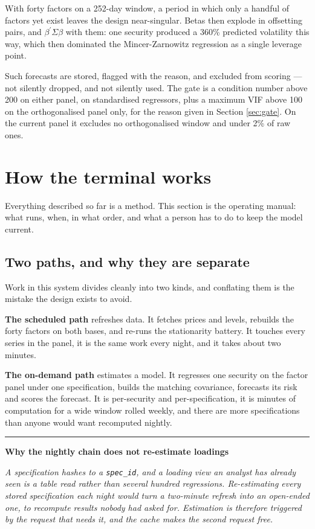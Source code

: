 \documentclass[11pt,a4paper]{article}
\newenvironment{decision}[1]
  {\par\vspace{1.7ex}%
   \begin{lrbox}{\decisionbox}\begin{minipage}{\textwidth}%
   {\color{rule}\rule{\textwidth}{0.4pt}}\par\vspace{0.7ex}
   {\small\sffamily\bfseries\color{navy}#1}\par\vspace{0.35ex}
   \small\itshape}
  {\par\vspace{0.7ex}\noindent{\color{rule}\rule{\textwidth}{0.4pt}}%
   \end{minipage}\end{lrbox}%
   \noindent\usebox{\decisionbox}\par\vspace{1.7ex}}
\newcommand{\code}[1]{\texttt{\small #1}}
\begin{document}
With forty factors on a 252-day window, a period in which only a handful of factors
yet exist leaves the design near-singular. Betas then explode in offsetting pairs, and
$\beta^{\prime}\Sigma\beta$ with them: one security produced a 360\% predicted
volatility this way, which then dominated the Mincer-Zarnowitz regression as a single
leverage point.

Such forecasts are stored, flagged with the reason, and excluded from scoring --- not
silently dropped, and not silently used. The gate is a condition number above 200 on
either panel, on standardised regressors, plus a maximum VIF above 100 on the
orthogonalised panel only, for the reason given in Section \ref{sec:gate}. On the
current panel it excludes no orthogonalised window and under 2\% of raw ones.

\section{How the terminal works}
\label{sec:workflow}

Everything described so far is a method. This section is the operating manual: what
runs, when, in what order, and what a person has to do to keep the model current.

\subsection{Two paths, and why they are separate}

Work in this system divides cleanly into two kinds, and conflating them is the
mistake the design exists to avoid.

\textbf{The scheduled path} refreshes data. It fetches prices and levels, rebuilds
the forty factors on both bases, and re-runs the stationarity battery. It touches
every series in the panel, it is the same work every night, and it takes about two
minutes.

\textbf{The on-demand path} estimates a model. It regresses one security on the
factor panel under one specification, builds the matching covariance, forecasts its
risk and scores the forecast. It is per-security and per-specification, it is
minutes of computation for a wide window rolled weekly, and there are more
specifications than anyone would want recomputed nightly.

\begin{decision}{Why the nightly chain does not re-estimate loadings}
A specification hashes to a \code{spec\_id}, and a loading view an analyst has
already seen is a table read rather than several hundred regressions. Re-estimating
every stored specification each night would turn a two-minute refresh into an
open-ended one, to recompute results nobody had asked for. Estimation is therefore
triggered by the request that needs it, and the cache makes the second request
free.
\end{decision}
\end{document}
